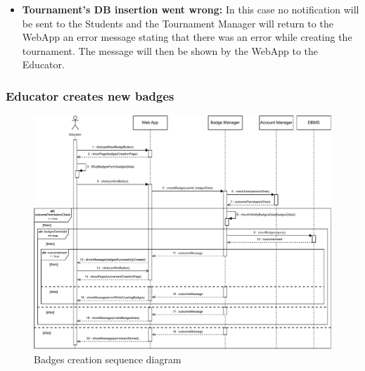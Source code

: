 \documentclass{article}
\begin{document}
{\begin{itemize}
            Tournament Manager component returns an error message to the WebApp, stating 
            that the data inserted is not valid. The message will then be shown to the 
            Educator by the WebApp.
            \item \textbf{Tournament's DB insertion went wrong:} In this case no 
            notification will be sent to the Students and the Tournament Manager will 
            return to the WebApp an error message stating that there was an error while 
            creating the tournament.
            The message will then be shown by the WebApp to the Educator.
        \end{itemize}

    \subsubsection{Educator creates new badges}
        \begin{figure}[H]
            \centering
            \hspace*{-3.3cm}\includegraphics[scale=0.85]{Sequence/Sequence4DD.pdf}
            \caption{Badges creation sequence diagram}
            \label{fig:Sequence4DD}
        \end{figure}

}
\end{document}
